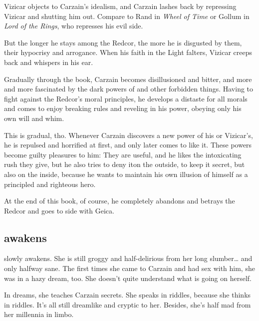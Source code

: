 Vizicar objects to Carzain's idealism, and Carzain lashes back by repressing Vizicar and shutting him out. Compare to Rand in \emph{Wheel of Time} or Gollum in \emph{Lord of the Rings}, who represses his evil side. 

But the longer he stays among the Redcor, the more he is disgusted by them, their hypocrisy and arrogance. When his faith in the Light falters, Vizicar creeps back and whispers in his ear. 

Gradually through the book, Carzain becomes disillusioned and bitter, and more and more fascinated by the dark powers of \nieur{} and other forbidden things. Having to fight against the Redcor's moral principles, he develops a distaste for all morals and comes to enjoy breaking rules and reveling in his power, obeying only his own will and whim. 

This is gradual, tho. Whenever Carzain discovers a new power of his or Vizicar's, he is repulsed and horrified at first, and only later comes to like it. These powers become guilty pleasures to him: They are useful, and he likes the intoxicating rush they give, but he also tries to deny it\dash on the outside, to keep it secret, but also on the inside, because he wants to maintain his own illusion of himself as a principled and righteous hero. 

At the end of this book, of course, he completely abandons and betrays the Redcor and goes to side with Geica. 









\subsection{\Belzir{} awakens}
\Belzir{} slowly awakens. 
She is still groggy and half-delirious from her long slumber\ldots{} and only halfway sane. 
The first times she came to Carzain and had sex with him, she was in a hazy dream, too. 
She doesn't quite understand what is going on herself. 

In dreams, she teaches Carzain secrets. 
She speaks in riddles, because she thinks in riddles. 
It's all still dreamlike and cryptic to her. 
Besides, she's half mad from her millennia in limbo. 


